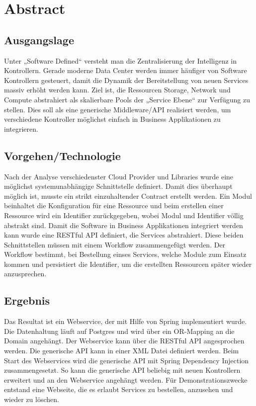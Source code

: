 \chapter*{Abstract}
\section*{Ausgangslage}
Unter „Software Defined“ versteht man die Zentralisierung der Intelligenz in Kontrollern. Gerade moderne Data Center werden immer häufiger von Software Kontrollern gesteuert, damit die Dynamik der Bereitstellung von neuen Services massiv erhöht werden kann. 
Ziel ist, die Ressourcen Storage, Network und Compute abstrahiert als skalierbare Pools der „Service Ebene“ zur Verfügung zu stellen. Dies soll als eine generische Middleware/\ac{API} realisiert werden, um verschiedene Kontroller möglichst einfach in Business Applikationen zu integrieren.

\section*{Vorgehen/Technologie}
Nach der Analyse verschiedenster Cloud Provider und Libraries wurde eine möglichst systemunabhängige Schnittstelle definiert. Damit dies überhaupt möglich ist, musste ein strikt einzuhaltender Contract erstellt werden. Ein Modul beinhaltet die Konfiguration für eine Ressource und beim erstellen einer Ressource wird ein Identifier zurückgegeben, wobei Modul und Identifier völlig abstrakt sind. Damit die Software in Business Applikationen integriert werden kann wurde eine RESTful API definiert, die Services abstrahiert. Diese beiden Schnittstellen müssen mit einem Workflow zusammengefügt werden. Der Workflow bestimmt, bei Bestellung einses Services,  welche Module zum Einsatz kommen und persistiert die Identifier, um die erstellten Ressourcen später wieder anzusprechen.

\section*{Ergebnis}
Das Resultat ist ein Webservice, der mit Hilfe von Spring implementiert wurde. Die Datenhaltung läuft auf Postgres und wird über ein OR-Mapping an die Domain angehängt. Der Webservice kann über die RESTful API angesprochen werden. Die generische API kann in einer \ac{XML} Datei definiert werden. Beim Start des Webservices wird die generische API mit Spring Dependency Injection zusammengesetzt. So kann die generische API beliebig mit neuen Kontrollern erweitert und an den Webservice angehängt werden. Für Demonstrationszwecke entstand eine Webseite, die es erlaubt Services zu bestellen, anzusehen und wieder zu löschen.